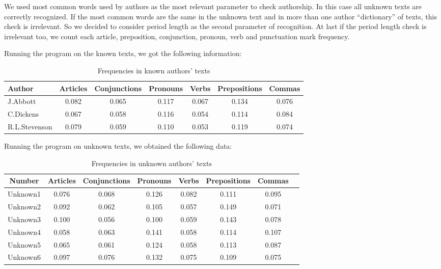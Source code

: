 \documentclass[a4paper,11pt, twoside]{article}
\begin{document}
		\bigskip

		\noindent
		We used most common words used by authors as the most relevant parameter to check authorship. In this case all unknown texts are correctly recognized. If the most common words are the same in the unknown text and in more than one author ``dictionary'' of texts, this check is irrelevant. So we decided to consider period length as the second parameter of recognition. At last if the period length check is irrelevant too, we count each article, preposition, conjunction, pronoun, verb and punctuation mark frequency.

		\noindent
		Running the program on the known texts, we got the following information:
		\begin{table}[h!]
			\small
			\begin{tabular}{lcccccc}
				\toprule
				Author   & Articles    & Conjunctions & Pronouns & Verbs & Prepositions &   Commas  \\
				\midrule
				J.Abbott      & 0.082  & 0.065 & 0.117 & 0.067 & 0.134 & 0.076  \\
				C.Dickens     & 0.067  & 0.058 & 0.116 & 0.054 & 0.114 & 0.084  \\
				R.L.Stevenson & 0.079  & 0.059 & 0.110 & 0.053 & 0.119 & 0.074  \\
				\bottomrule
			\end{tabular}
			\caption{Frequencies in known authors' texts}
			\label{tab:known-freq}
		\end{table}
		\bigskip

		\noindent
		Running the program on unknown texts, we obtained the following data:
		\begin{table}[h!]
			\small
			\begin{tabular}{cccccccc}
				\toprule
				Number & Articles & Conjunctions & Pronouns & Verbs & Prepositions & Commas \\
				\midrule
				Unknown1 & 0.076 & 0.068 & 0.126 & 0.082 & 0.111 & 0.095 \\
				Unknown2 & 0.092 & 0.062 & 0.105 & 0.057 & 0.149 & 0.071 \\
				Unknown3 & 0.100 & 0.056 & 0.100 & 0.059 & 0.143 & 0.078 \\
				Unknown4 & 0.058 & 0.063 & 0.141 & 0.058 & 0.114 & 0.107 \\
				Unknown5 & 0.065 & 0.061 & 0.124 & 0.058 & 0.113 & 0.087 \\
				Unknown6 & 0.097 & 0.076 & 0.132 & 0.075 & 0.109 & 0.075 \\
				\bottomrule
			\end{tabular}
			\caption{Frequencies in unknown authors' texts}
			\label{tab:unknown-freq}
		\end{table}
\end{document}
